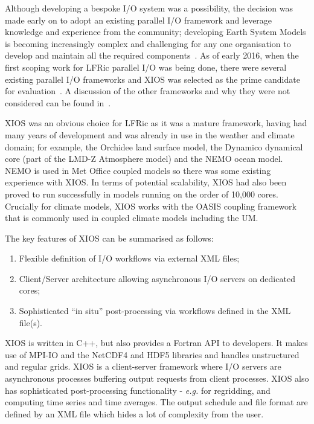 \documentclass[review,times]{elsarticle}
\begin{document}
Although developing a bespoke I/O system was a possibility, the decision was
made early on to adopt an existing parallel I/O framework and leverage knowledge and
experience from the community; developing Earth System Models is becoming increasingly
complex and challenging for any one organisation to develop and maintain all the required
components~\cite{gmd-2017-186}.
As of early 2016, when the first scoping work for LFRic parallel I/O was being done,
there were several existing parallel I/O frameworks and XIOS was selected as the prime
candidate for evaluation~\cite{XIOSWiki}. A discussion of the other frameworks and why
they were not considered can be found in~\cite{Adams2018}.

XIOS was an obvious choice for LFRic as it was a mature framework, having had many years
of development and was already in use in the weather and climate domain; for example,
the Orchidee land surface model, the Dynamico dynamical core (part of the LMD-Z
Atmosphere model) and the NEMO ocean model. NEMO is used in Met Office coupled
models so there was some existing experience with XIOS. In terms of potential scalability,
XIOS had also been proved to run successfully in models running on the order of 10,000
cores. Crucially for climate models, XIOS works with the OASIS coupling framework that
is commonly used in coupled climate models including the UM. 

The key features of XIOS can be summarised as follows:
\begin{enumerate}
  \item Flexible definition of I/O workflows via external XML files;
  \item Client/Server architecture allowing asynchronous I/O servers on dedicated cores;
  \item Sophisticated ``in situ'' post-processing via workflows defined in the XML file(s). 
\end{enumerate}

XIOS is written in C++, but also provides a Fortran API to developers. It makes use of
MPI-IO and the NetCDF4 and HDF5 libraries and handles unstructured and regular grids.
XIOS is a client-server framework where I/O servers are asynchronous processes buffering
output requests from client processes. XIOS also has sophisticated post-processing
functionality - {\em e.g.} for regridding, and computing time series
and time averages. The output schedule and
file format are defined by an XML file which hides a lot of complexity from the user.
\end{document}
